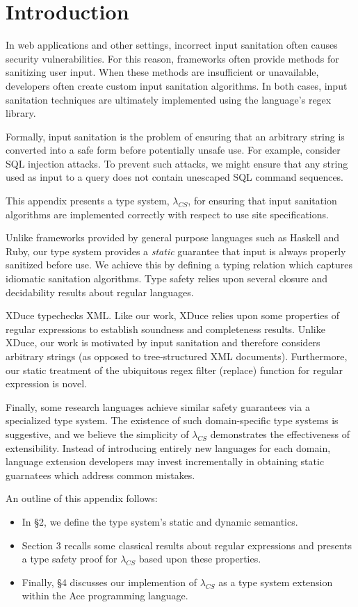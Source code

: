 \documentclass[10pt,preprint]{sigplanconf}
\theoremstyle{definition}
\newcommand{\lcs}{\lambda_{CS}}
\begin{document}
\section{Introduction}
In web applications and other settings, incorrect input sanitation often causes
security vulnerabilities. For this reason, frameworks often provide methods
for sanitizing user input. When these methods are insufficient or unavailable,
developers often create  custom input sanitation algorithms. In both cases,
input sanitation techniques are ultimately implemented using the language's
regex library.

Formally, input sanitation is the problem of ensuring that an arbitrary string
is converted into a safe form before potentially unsafe use. For example, consider
SQL injection attacks. To prevent such attacks, we might ensure that any string
used as input to a query does not contain unescaped SQL command sequences. 

This appendix presents a type system, $\lcs$, for ensuring that input 
sanitation algorithms are implemented correctly with respect to use site 
specifications.

Unlike frameworks provided by general purpose languages such as Haskell and
Ruby, our type system provides a \emph{static} guarantee that input is always 
properly sanitized before use. We achieve this by defining a typing relation
which captures idiomatic sanitation algorithms. Type safety relies upon 
several closure and decidability results about regular languages.

XDuce typechecks XML. Like our work, XDuce relies upon some properties of
regular expressions to establish soundness and completeness results. Unlike
XDuce, our work is motivated by input sanitation and therefore considers arbitrary
strings (as opposed to tree-structured XML documents). Furthermore, our static
treatment of the ubiquitous regex filter (replace) function for regular expression is novel.

Finally, some research languages achieve similar safety guarantees via a specialized type
system. The existence of such domain-specific type systems is suggestive, and 
we believe the simplicity of $\lcs$ demonstrates the effectiveness of
extensibility. Instead of introducing entirely new languages for each domain,
language extension developers may invest incrementally in obtaining static
guarnatees which address common mistakes.

An outline of this appendix follows:

\begin{itemize}
  \item In \S 2, we define the type system's static and dynamic semantics.
  \item Section 3 recalls some classical results about regular expressions and presents a type safety proof for $\lcs$ based upon these properties.
  \item Finally, \S 4 discusses our implemention of $\lcs$ as a type system extension  within the Ace programming language.
\end{itemize}
\end{document}
